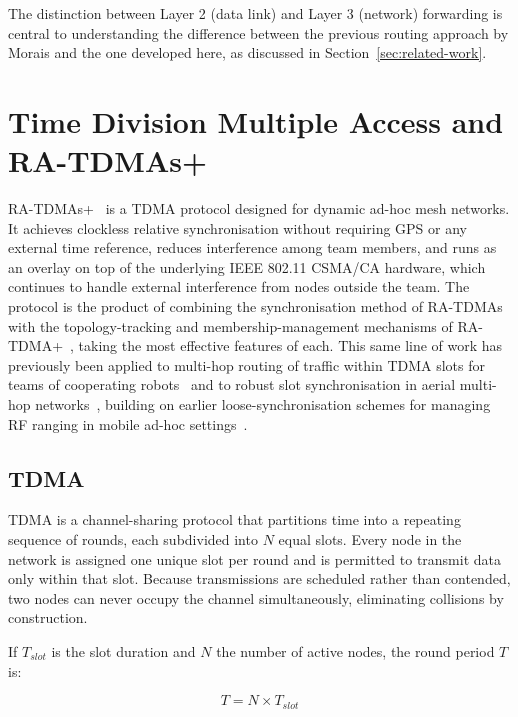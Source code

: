 The distinction between Layer 2 (data link) and Layer 3 (network) forwarding
is central to understanding the difference between the previous routing
approach by Morais and the one developed here, as discussed in
Section~\ref{sec:related-work}.


\section{Time Division Multiple Access and RA-TDMAs+}
\label{sec:ra-tdma}

RA-TDMAs+~\cite{oliveira2018clockless} is a TDMA protocol designed for
dynamic ad-hoc mesh networks. It achieves clockless relative
synchronisation without requiring GPS or any external time reference,
reduces interference among team members, and runs as an overlay on top of
the underlying IEEE 802.11 CSMA/CA hardware, which continues to handle
external interference from nodes outside the team. The protocol is the
product of combining the synchronisation method of RA-TDMAs~\cite{pinto2018robust}
with the topology-tracking and membership-management mechanisms of
RA-TDMA+~\cite{oliveira2018clockless}, taking the most effective features
of each. This same line of work has previously been applied to multi-hop
routing of traffic within TDMA slots for teams of cooperating
robots~\cite{oliveira2015multi} and to robust slot synchronisation in aerial
multi-hop networks~\cite{pinto2018robust,ramos2018aerial}, building on earlier
loose-synchronisation schemes for managing RF ranging in mobile ad-hoc
settings~\cite{oliveira2011loose}.

\subsection{TDMA}

TDMA is a channel-sharing protocol that
partitions time into a repeating sequence of rounds, each subdivided into
$N$ equal slots. Every node in the network is assigned one unique slot per
round and is permitted to transmit data only within that slot. Because
transmissions are scheduled rather than contended, two nodes can never
occupy the channel simultaneously, eliminating collisions by construction.

If $T_{slot}$ is the slot duration and $N$ the number of active nodes,
the round period $T$ is:

\begin{equation}
T = N \times T_{slot}
\label{eq:frame}
\end{equation}

